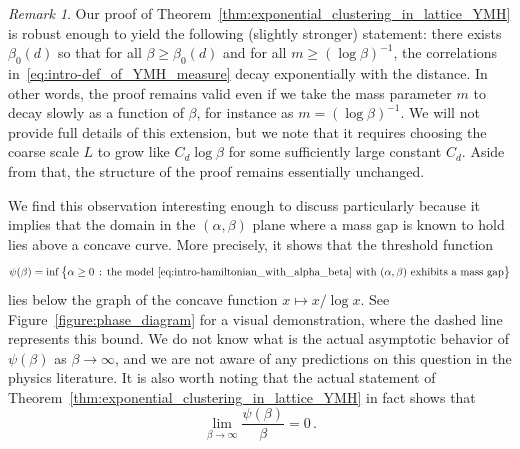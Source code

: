 \documentclass[11pt]{article}
\theoremstyle{definition}
\theoremstyle{remark}
\newtheorem{remark}[theorem]{Remark}
\numberwithin{theorem}{section}
\begin{document}
    
    \begin{remark}
    \label{remark:mass_tending_to_Zero}
    Our proof of Theorem~\ref{thm:exponential_clustering_in_lattice_YMH} is robust enough to yield the following (slightly stronger) statement: there exists $\beta_0(d)$ so that for all $\beta\ge \beta_0(d)$ and for all $m \ge (\log\beta)^{-1}$, the correlations in~\eqref{eq:intro-def_of_YMH_measure} decay exponentially with the distance. In other words, the proof remains valid even if we take the mass parameter $m$ to decay slowly as a function of $\beta$, for instance as $m = (\log \beta)^{-1}$. We will not provide full details of this extension, but we note that it requires choosing the coarse scale $L$ to grow like $C_d \log \beta$ for some sufficiently large constant $C_d$. Aside from that, the structure of the proof remains essentially unchanged. 

    We find this observation interesting enough to discuss particularly because it implies that the domain in the $(\alpha,\beta)$ plane where a mass gap is known to hold lies above a concave curve. More precisely, it shows that the threshold function
    \[
    \psi(\beta) = \inf \big\{ \alpha \ge 0 \, :  \, \text{the model~\eqref{eq:intro-hamiltonian_with_alpha_beta} with $(\alpha,\beta)$ exhibits a mass gap} \big\} 
    \]
    lies below the graph of the concave function $x\mapsto x/\log x$. See Figure~\ref{figure:phase_diagram} for a visual demonstration, where the dashed line represents this bound. We do not know what is the actual asymptotic behavior of $\psi(\beta)$ as $\beta\to\infty$, and we are not aware of any predictions on this question in the physics literature. It is also worth noting that the actual statement of Theorem~\ref{thm:exponential_clustering_in_lattice_YMH} in fact shows that $$ \lim_{\beta\to \infty} \frac{\psi(\beta)}{\beta} =0 \, . $$ 
    \end{remark}
    
\end{document}
